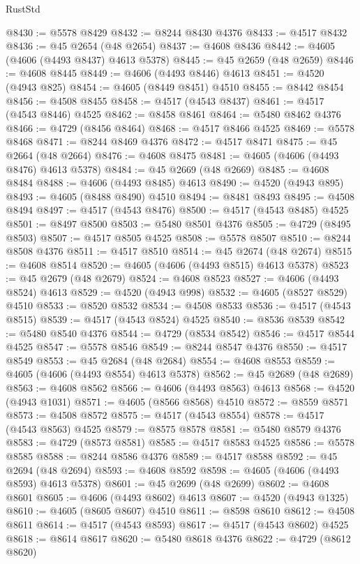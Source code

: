 \begin{lexlean}{RustStd}
\begin{coremodule}
@8430 := @5578 @8429
@8432 := @8244 @8430 @4376
@8433 := @4517 @8432
@8436 := @45 @2654 (@48 @2654)
@8437 := @4608 @8436
@8442 := @4605 (@4606 (@4493 @8437) @4613 @5378)
@8445 := @45 @2659 (@48 @2659)
@8446 := @4608 @8445
@8449 := @4606 (@4493 @8446) @4613
@8451 := @4520 (@4943 @825)
@8454 := @4605 (@8449 @8451) @4510
@8455 := @8442 @8454
@8456 := @4508 @8455
@8458 := @4517 (@4543 @8437)
@8461 := @4517 (@4543 @8446) @4525
@8462 := @8458 @8461
@8464 := @5480 @8462 @4376
@8466 := @4729 (@8456 @8464)
@8468 := @4517 @8466 @4525
@8469 := @5578 @8468
@8471 := @8244 @8469 @4376
@8472 := @4517 @8471
@8475 := @45 @2664 (@48 @2664)
@8476 := @4608 @8475
@8481 := @4605 (@4606 (@4493 @8476) @4613 @5378)
@8484 := @45 @2669 (@48 @2669)
@8485 := @4608 @8484
@8488 := @4606 (@4493 @8485) @4613
@8490 := @4520 (@4943 @895)
@8493 := @4605 (@8488 @8490) @4510
@8494 := @8481 @8493
@8495 := @4508 @8494
@8497 := @4517 (@4543 @8476)
@8500 := @4517 (@4543 @8485) @4525
@8501 := @8497 @8500
@8503 := @5480 @8501 @4376
@8505 := @4729 (@8495 @8503)
@8507 := @4517 @8505 @4525
@8508 := @5578 @8507
@8510 := @8244 @8508 @4376
@8511 := @4517 @8510
@8514 := @45 @2674 (@48 @2674)
@8515 := @4608 @8514
@8520 := @4605 (@4606 (@4493 @8515) @4613 @5378)
@8523 := @45 @2679 (@48 @2679)
@8524 := @4608 @8523
@8527 := @4606 (@4493 @8524) @4613
@8529 := @4520 (@4943 @998)
@8532 := @4605 (@8527 @8529) @4510
@8533 := @8520 @8532
@8534 := @4508 @8533
@8536 := @4517 (@4543 @8515)
@8539 := @4517 (@4543 @8524) @4525
@8540 := @8536 @8539
@8542 := @5480 @8540 @4376
@8544 := @4729 (@8534 @8542)
@8546 := @4517 @8544 @4525
@8547 := @5578 @8546
@8549 := @8244 @8547 @4376
@8550 := @4517 @8549
@8553 := @45 @2684 (@48 @2684)
@8554 := @4608 @8553
@8559 := @4605 (@4606 (@4493 @8554) @4613 @5378)
@8562 := @45 @2689 (@48 @2689)
@8563 := @4608 @8562
@8566 := @4606 (@4493 @8563) @4613
@8568 := @4520 (@4943 @1031)
@8571 := @4605 (@8566 @8568) @4510
@8572 := @8559 @8571
@8573 := @4508 @8572
@8575 := @4517 (@4543 @8554)
@8578 := @4517 (@4543 @8563) @4525
@8579 := @8575 @8578
@8581 := @5480 @8579 @4376
@8583 := @4729 (@8573 @8581)
@8585 := @4517 @8583 @4525
@8586 := @5578 @8585
@8588 := @8244 @8586 @4376
@8589 := @4517 @8588
@8592 := @45 @2694 (@48 @2694)
@8593 := @4608 @8592
@8598 := @4605 (@4606 (@4493 @8593) @4613 @5378)
@8601 := @45 @2699 (@48 @2699)
@8602 := @4608 @8601
@8605 := @4606 (@4493 @8602) @4613
@8607 := @4520 (@4943 @1325)
@8610 := @4605 (@8605 @8607) @4510
@8611 := @8598 @8610
@8612 := @4508 @8611
@8614 := @4517 (@4543 @8593)
@8617 := @4517 (@4543 @8602) @4525
@8618 := @8614 @8617
@8620 := @5480 @8618 @4376
@8622 := @4729 (@8612 @8620)

\end{coremodule}
\end{lexlean}
